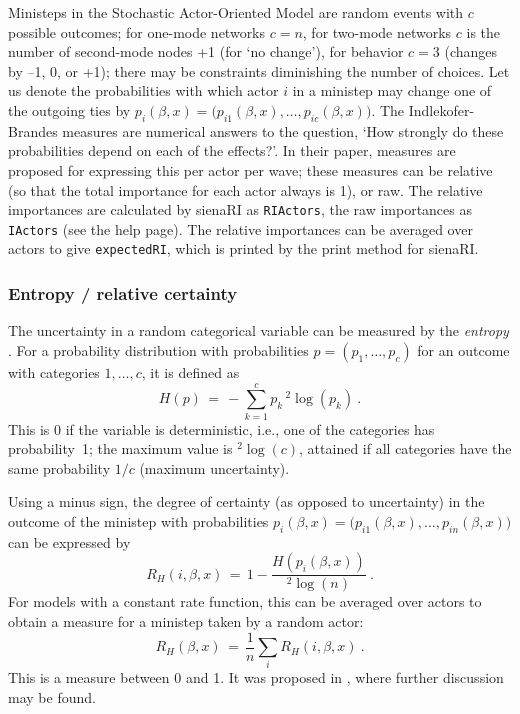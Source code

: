 \documentclass[a4paper,fleqn,11pt]{article}
\newcommand{\+}{\, + \,}
\newcommand{\sfn}[1]{\textsf{#1}}
\newcommand{\saom}{{Stochastic Actor-Oriented Model}}
\begin{document}
Ministeps in the {\saom} are random events with $c$ possible outcomes;
for one-mode networks $c = n$, for two-mode networks $c$ is the
number of second-mode nodes +1 (for `no change'), for behavior
$c=3$ (changes by --1, 0, or +1); there may be constraints
diminishing the number of choices.
Let us denote the probabilities with which
actor $i$ in a ministep may change one of the outgoing ties by
$p_{i}(\beta, x) = \big(p_{i1}(\beta, x), \ldots, p_{ic}(\beta, x)\big)$.
The Indlekofer-Brandes measures are numerical answers to the question,
`How strongly do these probabilities depend on each of the effects?'.
In their paper, measures are proposed for expressing this per actor
per wave; these measures can be relative (so that the total importance
for each actor always is 1), or raw.
The relative importances are calculated by  \sfn{sienaRI} as \texttt{RIActors},
the raw importances as \texttt{IActors} (see the help page).
The  relative importances can be averaged over actors to give
\texttt{expectedRI}, which is printed by the print method for \sfn{sienaRI}.

\subsubsection{Entropy / relative certainty}

The uncertainty in a random categorical variable
can be measured by the \emph{entropy} \citep{Shannon1948}. For a probability
distribution with probabilities $p = (p_1, \ldots, p_c)$ for
an outcome with categories $1, \ldots, c$, it is defined as
\begin{equation}\label{entropy}
  H(p) \,=\, - \sum_{k=1}^c p_k {}\,^2 \log(p_k) \ .
\end{equation}
This is 0 if the variable is deterministic, i.e., one of the categories
has probability~1; the maximum value is ${}^2 \log(c)$, attained if all
categories have the same probability $1/c$ (maximum uncertainty).

Using a minus sign, the degree of certainty (as opposed to uncertainty)
in the outcome of the ministep with probabilities
$p_{i}(\beta, x) = \big(p_{i1}(\beta, x), \ldots, p_{in}(\beta, x)\big)$
can be expressed by
\begin{equation}\label{uncertainty}
  R_H(i,\beta, x) \,=\,  1 - \frac{H(p_{i}(\beta, x))}{{}^2 \log(n)} \ .
\end{equation}
For models with a constant rate function, this can be averaged over
actors to obtain a measure for a ministep taken by a random actor:
\begin{equation}\label{explained}
  R_H(\beta, x) \,=\, \frac1n \sum_i R_H(i,\beta, x) \ .
\end{equation}
This is a measure between 0 and 1.
It was proposed in \citet{Snijders04}, where further discussion may be found.
\end{document}
